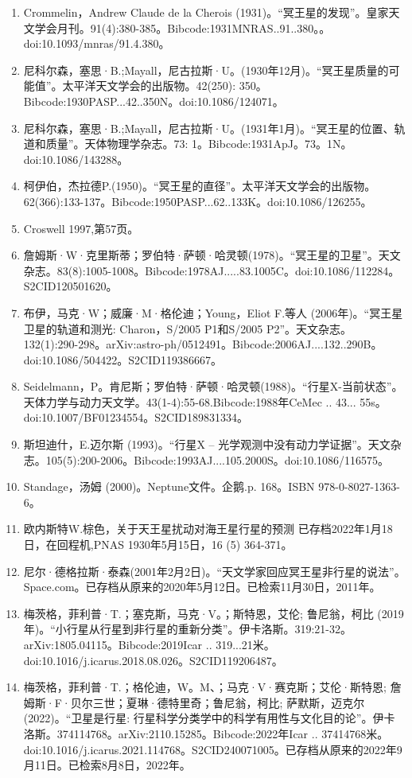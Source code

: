 \begin{enumerate}
\item Crommelin，Andrew Claude de la Cherois (1931)。“冥王星的发现”。皇家天文学会月刊。91(4):380-385。Bibcode:1931MNRAS..91..380。。doi:10.1093/mnras/91.4.380。
\item 尼科尔森，塞思·B.;Mayall，尼古拉斯·U。(1930年12月)。“冥王星质量的可能值”。太平洋天文学会的出版物。42(250): 350。Bibcode:1930PASP...42..350N。doi:10.1086/124071。
\item 尼科尔森，塞思·B.;Mayall，尼古拉斯·U。(1931年1月)。“冥王星的位置、轨道和质量”。天体物理学杂志。73: 1。Bibcode:1931ApJ。73。1N。doi:10.1086/143288。
\item 柯伊伯，杰拉德P.(1950)。“冥王星的直径”。太平洋天文学会的出版物。62(366):133-137。Bibcode:1950PASP...62..133K。doi:10.1086/126255。
\item Croswell 1997,第57页。
\item 詹姆斯·W·克里斯蒂；罗伯特·萨顿·哈灵顿(1978)。“冥王星的卫星”。天文杂志。83(8):1005-1008。Bibcode:1978AJ.....83.1005C。doi:10.1086/112284。S2CID120501620。 
\item 布伊，马克·W；威廉·M·格伦迪；Young，Eliot F.等人 (2006年)。“冥王星卫星的轨道和测光: Charon，S/2005 P1和S/2005 P2”。天文杂志。132(1):290-298。arXiv:astro-ph/0512491。Bibcode:2006AJ....132..290B。doi:10.1086/504422。S2CID119386667。 
\item Seidelmann，P。肯尼斯；罗伯特·萨顿·哈灵顿(1988)。“行星X-当前状态”。天体力学与动力天文学。43(1-4):55-68.Bibcode:1988年CeMec .. 43... 55s。doi:10.1007/BF01234554。S2CID189831334。 
\item 斯坦迪什，E.迈尔斯 (1993)。“行星X -- 光学观测中没有动力学证据”。天文杂志。105(5):200-2006。Bibcode:1993AJ....105.2000S。doi:10.1086/116575。
\item Standage，汤姆 (2000)。Neptune文件。企鹅.p. 168。ISBN 978-0-8027-1363-6。
\item 欧内斯特W.棕色，关于天王星扰动对海王星行星的预测 已存档2022年1月18日，在回程机,PNAS 1930年5月15日，16 (5) 364-371。
\item 尼尔·德格拉斯·泰森(2001年2月2日)。“天文学家回应冥王星非行星的说法”。Space.com。已存档从原来的2020年5月12日。已检索11月30日，2011年。
\item 梅茨格，菲利普·T.；塞克斯，马克·V。；斯特恩，艾伦; 鲁尼翁，柯比 (2019年)。“小行星从行星到非行星的重新分类”。伊卡洛斯。319:21-32。arXiv:1805.04115。Bibcode:2019Icar .. 319...21米。doi:10.1016/j.icarus.2018.08.026。S2CID119206487。 
\item 梅茨格，菲利普·T.；格伦迪，W。M、；马克·V·赛克斯；艾伦·斯特恩; 詹姆斯·F·贝尔三世；夏琳·德特里奇；鲁尼翁，柯比; 萨默斯，迈克尔 (2022)。“卫星是行星: 行星科学分类学中的科学有用性与文化目的论”。伊卡洛斯。374114768。arXiv:2110.15285。Bibcode:2022年Icar .. 37414768米。doi:10.1016/j.icarus.2021.114768。S2CID240071005。已存档从原来的2022年9月11日。已检索8月8日，2022年。 

\end{enumerate}
